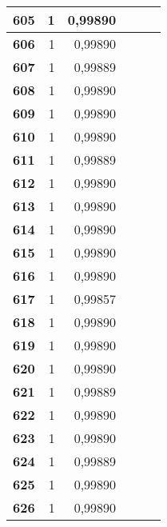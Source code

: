 {\begin{longtable}{|r|r|r|l|r|r|}
\textbf{605} & 1 & 0,99890 &  & \multicolumn{1}{l|}{} & \multicolumn{1}{l|}{} \\ \hline
\textbf{606} & 1 & 0,99890 &  & \multicolumn{1}{l|}{} & \multicolumn{1}{l|}{} \\ \hline
\textbf{607} & 1 & 0,99889 &  & \multicolumn{1}{l|}{} & \multicolumn{1}{l|}{} \\ \hline
\textbf{608} & 1 & 0,99890 &  & \multicolumn{1}{l|}{} & \multicolumn{1}{l|}{} \\ \hline
\textbf{609} & 1 & 0,99890 &  & \multicolumn{1}{l|}{} & \multicolumn{1}{l|}{} \\ \hline
\textbf{610} & 1 & 0,99890 &  & \multicolumn{1}{l|}{} & \multicolumn{1}{l|}{} \\ \hline
\textbf{611} & 1 & 0,99889 &  & \multicolumn{1}{l|}{} & \multicolumn{1}{l|}{} \\ \hline
\textbf{612} & 1 & 0,99890 &  & \multicolumn{1}{l|}{} & \multicolumn{1}{l|}{} \\ \hline
\textbf{613} & 1 & 0,99890 &  & \multicolumn{1}{l|}{} & \multicolumn{1}{l|}{} \\ \hline
\textbf{614} & 1 & 0,99890 &  & \multicolumn{1}{l|}{} & \multicolumn{1}{l|}{} \\ \hline
\textbf{615} & 1 & 0,99890 &  & \multicolumn{1}{l|}{} & \multicolumn{1}{l|}{} \\ \hline
\textbf{616} & 1 & 0,99890 &  & \multicolumn{1}{l|}{} & \multicolumn{1}{l|}{} \\ \hline
\textbf{617} & 1 & 0,99857 &  & \multicolumn{1}{l|}{} & \multicolumn{1}{l|}{} \\ \hline
\textbf{618} & 1 & 0,99890 &  & \multicolumn{1}{l|}{} & \multicolumn{1}{l|}{} \\ \hline
\textbf{619} & 1 & 0,99890 &  & \multicolumn{1}{l|}{} & \multicolumn{1}{l|}{} \\ \hline
\textbf{620} & 1 & 0,99890 &  & \multicolumn{1}{l|}{} & \multicolumn{1}{l|}{} \\ \hline
\textbf{621} & 1 & 0,99889 &  & \multicolumn{1}{l|}{} & \multicolumn{1}{l|}{} \\ \hline
\textbf{622} & 1 & 0,99890 &  & \multicolumn{1}{l|}{} & \multicolumn{1}{l|}{} \\ \hline
\textbf{623} & 1 & 0,99890 &  & \multicolumn{1}{l|}{} & \multicolumn{1}{l|}{} \\ \hline
\textbf{624} & 1 & 0,99889 &  & \multicolumn{1}{l|}{} & \multicolumn{1}{l|}{} \\ \hline
\textbf{625} & 1 & 0,99890 &  & \multicolumn{1}{l|}{} & \multicolumn{1}{l|}{} \\ \hline
\textbf{626} & 1 & 0,99890 &  & \multicolumn{1}{l|}{} & \multicolumn{1}{l|}{} \\ \hline
\end{longtable}
}
